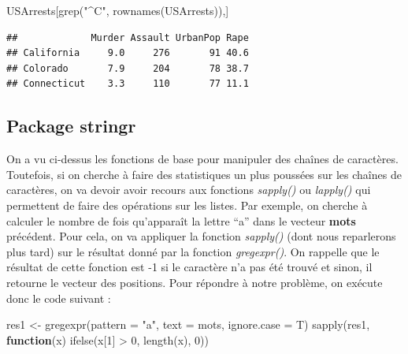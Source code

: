 \documentclass[
]{book}
\newenvironment{Shaded}{\begin{snugshade}}{\end{snugshade}}
\newcommand{\AttributeTok}[1]{\textcolor[rgb]{0.77,0.63,0.00}{#1}}
\newcommand{\ControlFlowTok}[1]{\textcolor[rgb]{0.13,0.29,0.53}{\textbf{#1}}}
\newcommand{\DecValTok}[1]{\textcolor[rgb]{0.00,0.00,0.81}{#1}}
\newcommand{\FunctionTok}[1]{\textcolor[rgb]{0.00,0.00,0.00}{#1}}
\newcommand{\NormalTok}[1]{#1}
\newcommand{\OtherTok}[1]{\textcolor[rgb]{0.56,0.35,0.01}{#1}}
\newcommand{\SpecialCharTok}[1]{\textcolor[rgb]{0.00,0.00,0.00}{#1}}
\newcommand{\StringTok}[1]{\textcolor[rgb]{0.31,0.60,0.02}{#1}}
\theoremstyle{definition}
\theoremstyle{definition}
\theoremstyle{definition}
\theoremstyle{definition}
\theoremstyle{remark}
\begin{document}
\begin{Shaded}
\begin{Highlighting}[]
\NormalTok{USArrests[}\FunctionTok{grep}\NormalTok{(}\StringTok{"\^{}C"}\NormalTok{, }\FunctionTok{rownames}\NormalTok{(USArrests)),]}
\end{Highlighting}
\end{Shaded}

\begin{verbatim}
##             Murder Assault UrbanPop Rape
## California     9.0     276       91 40.6
## Colorado       7.9     204       78 38.7
## Connecticut    3.3     110       77 11.1
\end{verbatim}

\hypertarget{package-stringr}{%
\subsection{\texorpdfstring{Package \textbf{stringr}}{Package stringr}}\label{package-stringr}}

On a vu ci-dessus les fonctions de base pour manipuler des chaînes de caractères. Toutefois, si on cherche à faire des statistiques un plus poussées sur les chaînes de caractères, on va devoir avoir recours aux fonctions \emph{sapply()} ou \emph{lapply()} qui permettent de faire des opérations sur les listes. Par exemple, on cherche à calculer le nombre de fois qu'apparaît la lettre ``a'' dans le vecteur \textbf{mots} précédent. Pour cela, on va appliquer la fonction \emph{sapply()} (dont nous reparlerons plus tard) sur le résultat donné par la fonction \emph{gregexpr()}. On rappelle que le résultat de cette fonction est -1 si le caractère n'a pas été trouvé et sinon, il retourne le vecteur des positions. Pour répondre à notre problème, on exécute donc le code suivant :

\begin{Shaded}
\begin{Highlighting}[]
\NormalTok{res1 }\OtherTok{\textless{}{-}} \FunctionTok{gregexpr}\NormalTok{(}\AttributeTok{pattern =} \StringTok{"a"}\NormalTok{, }\AttributeTok{text =}\NormalTok{ mots, }\AttributeTok{ignore.case =}\NormalTok{ T)}
\FunctionTok{sapply}\NormalTok{(res1, }\ControlFlowTok{function}\NormalTok{(x) }\FunctionTok{ifelse}\NormalTok{(x[}\DecValTok{1}\NormalTok{] }\SpecialCharTok{\textgreater{}} \DecValTok{0}\NormalTok{, }\FunctionTok{length}\NormalTok{(x), }\DecValTok{0}\NormalTok{)) }
\end{Highlighting}
\end{Shaded}
\end{document}
